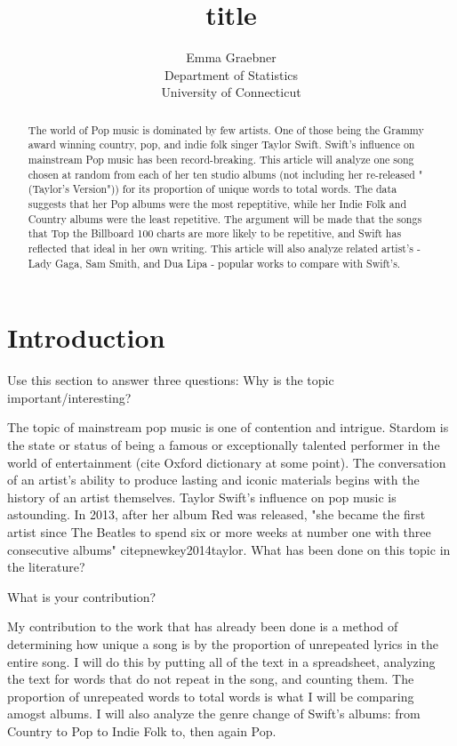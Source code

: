\documentclass[12pt]{article}
\title{title}
\author{Emma Graebner\\
  Department of Statistics\\
  University of Connecticut
}
\begin{document}
\maketitle

\begin{abstract}
The world of Pop music is dominated by few artists. One of those being the Grammy award winning country, pop, and indie folk singer Taylor Swift. Swift's influence on mainstream Pop music has been record-breaking. This article will analyze one song chosen at random from each of her ten studio albums (not including her re-released "(Taylor's Version")) for its proportion of unique words to total words. The data suggests that her Pop albums were the most repeptitive, while her Indie Folk and Country albums were the least repetitive. The argument will be made that the songs that Top the Billboard 100 charts are more likely to be repetitive, and Swift has reflected that ideal in her own writing. This article will also analyze related artist's - Lady Gaga, Sam Smith, and Dua Lipa - popular works to compare with Swift's.   
\end{abstract}


\section{Introduction}
\label{sec:intro}

Use this section to answer three questions:
Why is the topic important/interesting?

  The topic of mainstream pop music is one of contention and intrigue. Stardom is the state or status of being a famous or exceptionally talented performer in the world of entertainment (cite Oxford dictionary at some point). The conversation of an artist's ability to produce lasting and iconic materials begins with the history of an artist themselves. Taylor Swift's influence on pop music is astounding. In 2013, after her album Red was released, "she became the first artist since The Beatles to spend
  six or more weeks at number one with three consecutive albums" citep{newkey2014taylor}.
What has been done on this topic in the literature?

What is your contribution?

My contribution to the work that has already been done is a method of determining how unique a song is by the proportion of unrepeated lyrics in the entire song. I will do this by putting all of the text in a spreadsheet, analyzing the text for words that do not repeat in the song, and counting them. The proportion of unrepeated words to total words is what I will be comparing amogst albums.
I will also analyze the genre change of Swift's albums: from Country to Pop to Indie Folk to, then again Pop.   
\end{document}
